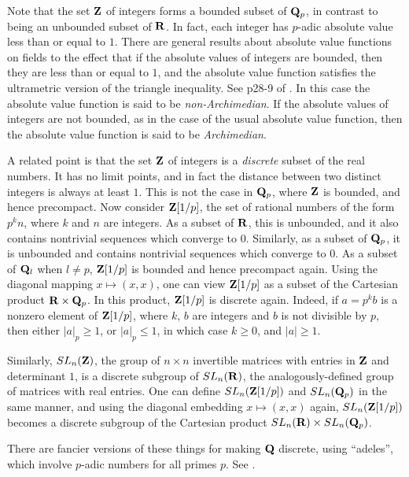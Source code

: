 \documentclass[12pt,leqno,draft]{article}
\begin{document}
	Note that the set ${\bf Z}$ of integers forms a bounded subset
of ${\bf Q}_p$, in contrast to being an unbounded subset of ${\bf R}$.
In fact, each integer has $p$-adic absolute value less than or equal
to $1$.  There are general results about absolute value functions on
fields to the effect that if the absolute values of integers are bounded,
then they are less than or equal to $1$, and the absolute value function
satisfies the ultrametric version of the triangle inequality.  See p28-9
of \cite{Gouvea}.  In this case the absolute value function is said to
be \emph{non-Archimedian}.  If the absolute values of integers are not
bounded, as in the case of the usual absolute value function, then the
absolute value function is said to be \emph{Archimedian}.

	A related point is that the set ${\bf Z}$ of integers is a
\emph{discrete} subset of the real numbers.  It has no limit points,
and in fact the distance between two distinct integers is always at
least $1$.  This is not the case in ${\bf Q}_p$, where ${\bf Z}$ is
bounded, and hence precompact.  Now consider ${\bf Z}[1/p]$, the set
of rational numbers of the form $p^k n$, where $k$ and $n$ are
integers.  As a subset of ${\bf R}$, this is unbounded, and it also
contains nontrivial sequences which converge to $0$.  Similarly, as a
subset of ${\bf Q}_p$, it is unbounded and contains nontrivial
sequences which converge to $0$.  As a subset of ${\bf Q}_l$ when $l
\ne p$, ${\bf Z}[1/p]$ is bounded and hence precompact again.  Using
the diagonal mapping $x \mapsto (x, x)$, one can view ${\bf Z}[1/p]$
as a subset of the Cartesian product ${\bf R} \times {\bf Q}_p$.  In
this product, ${\bf Z}[1/p]$ is discrete again.  Indeed, if $a = p^k
b$ is a nonzero element of ${\bf Z}[1/p]$, where $k$, $b$ are integers
and $b$ is not divisible by $p$, then either $|a|_p \ge 1$, or $|a|_p
\le 1$, in which case $k \ge 0$, and $|a| \ge 1$.

	Similarly, $SL_n({\bf Z})$, the group of $n \times n$
invertible matrices with entries in ${\bf Z}$ and determinant $1$, is
a discrete subgroup of $SL_n({\bf R})$, the analogously-defined group
of matrices with real entries.  One can define $SL_n({\bf Z}[1/p])$
and $SL_n({\bf Q}_p)$ in the same manner, and using the diagonal
embedding $x \mapsto (x, x)$ again, $SL_n({\bf Z}[1/p])$ becomes a
discrete subgroup of the Cartesian product $SL_n({\bf R}) \times
SL_n({\bf Q}_p)$.

	There are fancier versions of these things for making ${\bf
Q}$ discrete, using ``adeles'', which involve $p$-adic numbers for all
primes $p$.  See \cite{Weil}.
\end{document}
